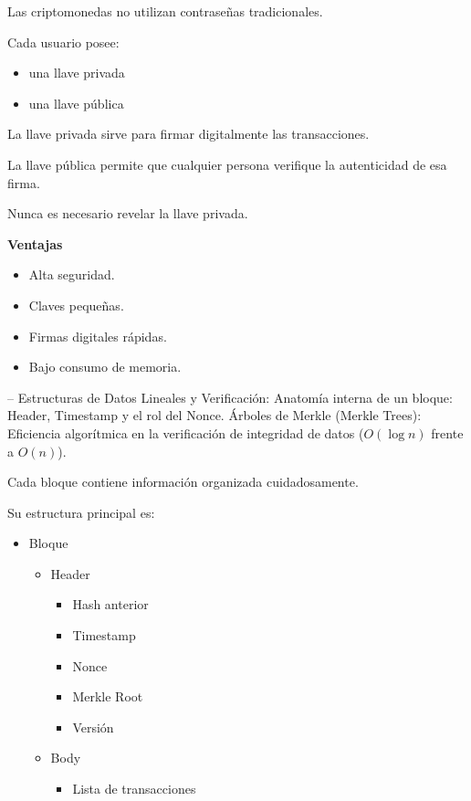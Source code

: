 \documentclass[12pt,a4paper]{article}
\begin{document}
Las criptomonedas no utilizan contraseñas tradicionales.

Cada usuario posee:

\begin{itemize}
  \item una llave privada
  \item una llave pública
\end{itemize}

La llave privada sirve para firmar digitalmente las transacciones.

La llave pública permite que cualquier persona verifique la autenticidad de esa firma.

Nunca es necesario revelar la llave privada.

\textbf{Ventajas}

\begin{itemize}
  \item Alta seguridad.
  \item Claves pequeñas.
  \item Firmas digitales rápidas.
  \item Bajo consumo de memoria.
\end{itemize}

-- Estructuras de Datos Lineales y Verificación: Anatomía interna de un bloque: Header, Timestamp y el rol del Nonce. Árboles de Merkle (Merkle Trees): Eficiencia algorítmica en la verificación de integridad de datos ($O(\log n)$ frente a $O(n)$).

Cada bloque contiene información organizada cuidadosamente.

Su estructura principal es:

\begin{itemize}
  \item Bloque
  \begin{itemize}
    \item Header
    \begin{itemize}
      \item Hash anterior
      \item Timestamp
      \item Nonce
      \item Merkle Root
      \item Versión
    \end{itemize}
    \item Body
    \begin{itemize}
      \item Lista de transacciones
    \end{itemize}
  \end{itemize}
\end{itemize}
\end{document}
